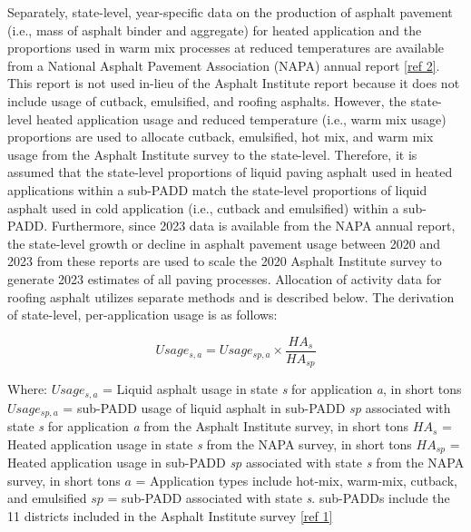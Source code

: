 \documentclass[
  11pt,
  oneside]{book}
\begin{document}
Separately, state-level, year-specific data on the production of asphalt pavement (i.e., mass of asphalt binder and aggregate) for heated application and the proportions used in warm mix processes at reduced temperatures are available from a National Asphalt Pavement Association (NAPA) annual report \hyperref[asphalt-references]{{[}ref 2{]}}. This report is not used in-lieu of the Asphalt Institute report because it does not include usage of cutback, emulsified, and roofing asphalts. However, the state-level heated application usage and reduced temperature (i.e., warm mix usage) proportions are used to allocate cutback, emulsified, hot mix, and warm mix usage from the Asphalt Institute survey to the state-level. Therefore, it is assumed that the state-level proportions of liquid paving asphalt used in heated applications within a sub-PADD match the state-level proportions of liquid asphalt used in cold application (i.e., cutback and emulsified) within a sub-PADD. Furthermore, since 2023 data is available from the NAPA annual report, the state-level growth or decline in asphalt pavement usage between 2020 and 2023 from these reports are used to scale the 2020 Asphalt Institute survey to generate 2023 estimates of all paving processes. Allocation of activity data for roofing asphalt utilizes separate methods and is described below. The derivation of state-level, per-application usage is as follows:

\begin{equation} 
  Usage_{s,a} = Usage_{sp,a} \times \frac{HA_{s}}{HA_{sp}}
  \label{eq:state-usage}
\end{equation}

Where: \newline
\(Usage_{s,a}\) = Liquid asphalt usage in state \emph{s} for application \emph{a}, in short tons \newline
\(Usage_{sp,a}\) = sub-PADD usage of liquid asphalt in sub-PADD \emph{sp} associated with state \emph{s} for application \emph{a} from the Asphalt Institute survey, in short tons \newline
\(HA_{s}\) = Heated application usage in state \emph{s} from the NAPA survey, in short tons \newline
\(HA_{sp}\) = Heated application usage in sub-PADD \emph{sp} associated with state \emph{s} from the NAPA survey, in short tons \newline
\(a\) = Application types include hot-mix, warm-mix, cutback, and emulsified \newline
\(sp\) = sub-PADD associated with state \emph{s}. sub-PADDs include the 11 districts included in the Asphalt Institute survey \hyperref[ref-1]{{[}ref 1{]}} \newline
\end{document}
